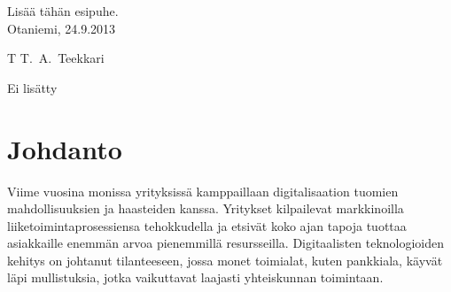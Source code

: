 \documentclass[finnish,12pt,a4paper,pdftex]{article}
\begin{document}
Lisää tähän esipuhe.\\

\vspace{5cm}
Otaniemi, 24.9.2013

\vspace{5mm}
{\hfill T T.\ A.\ Teekkari \hspace{1cm}}

\newpage


\thesistableofcontents



Ei lisätty


\cleardoublepage
\storeinipagenumber
{}
\setcounter{page}{1}


\section{Johdanto}

\thispagestyle{empty}

Viime vuosina monissa yrityksissä kamppaillaan digitalisaation tuomien mahdollisuuksien ja haasteiden kanssa. Yritykset kilpailevat markkinoilla liiketoimintaprosessiensa tehokkudella ja etsivät koko ajan tapoja tuottaa asiakkaille enemmän arvoa pienemmillä resursseilla. Digitaalisten teknologioiden kehitys on johtanut tilanteeseen, jossa monet toimialat, kuten pankkiala, käyvät läpi mullistuksia, jotka vaikuttavat laajasti yhteiskunnan toimintaan. \citep{jungner}\\
\end{document}
